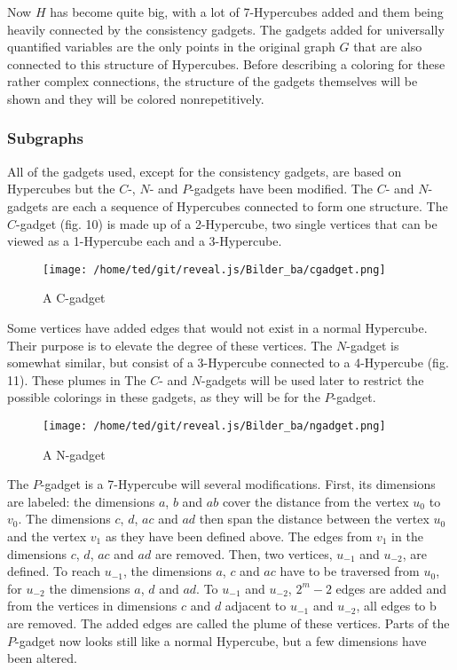 \documentclass[12pt,a4paper]{article}
\begin{document}
\newline
Now $H$ has become quite big, with a lot of 7-Hypercubes added and them being heavily connected by the consistency gadgets. The gadgets added for universally quantified variables are the only points in the original graph $G$ that are also connected to this structure of Hypercubes. Before describing a coloring for these rather complex connections, the structure of the gadgets themselves will be shown and they will be colored nonrepetitively. 
  
\subsubsection{Subgraphs}

All of the gadgets used, except for the consistency gadgets, are based on Hypercubes but the $C$-, $N$- and $P$-gadgets have been modified. The $C$- and $N$-gadgets are each a sequence of Hypercubes connected to form one structure. The $C$-gadget (fig. 10) is made up of a 2-Hypercube, two single vertices that can be viewed as a 1-Hypercube each and a 3-Hypercube.
\begin{figure}[h]
\texttt{[image: /home/ted/git/reveal.js/Bilder\_ba/cgadget.png]} 
\caption{A C-gadget \citep{Manin2008}}
\end{figure}
\newpage
Some vertices have added edges that would not exist in a normal Hypercube. Their purpose is to elevate the degree of these vertices. The $N$-gadget is somewhat similar, but consist of a 3-Hypercube connected to a 4-Hypercube (fig. 11). These plumes in The $C$- and $N$-gadgets will be used later to restrict the possible colorings in these gadgets, as they will be for the $P$-gadget.
\begin{figure}[h]
\texttt{[image: /home/ted/git/reveal.js/Bilder\_ba/ngadget.png]} 
\caption{A N-gadget \citep{Manin2008}}
\end{figure}
\newline
The $P$-gadget is a 7-Hypercube will several modifications. First, its dimensions are labeled: the dimensions $a$, $b$ and $ab$ cover the distance from the vertex $u_0$ to $v_0$. The dimensions $c$, $d$, $ac$ and $ad$ then span the distance between the vertex $u_0$ and the vertex $v_1$ as they have been defined above. The edges from $v_1$ in the dimensions $c$, $d$, $ac$ and $ad$ are removed. Then, two vertices, $u_{-1}$ and $u_{-2}$, are defined. To reach $u_{-1}$, the dimensions $a$, $c$ and $ac$ have to be traversed from $u_0$, for $u_{-2}$ the dimensions $a$, $d$ and $ad$. To $u_{-1}$ and $u_{-2}$, $2^m-2$ edges are added and from the vertices in dimensions $c$ and $d$ adjacent to $u_{-1}$ and $u_{-2}$, all edges to b are removed. The added edges are called the plume of these vertices. Parts of the $P$-gadget now looks still like a normal Hypercube, but a few dimensions have been altered. 
\end{document}
